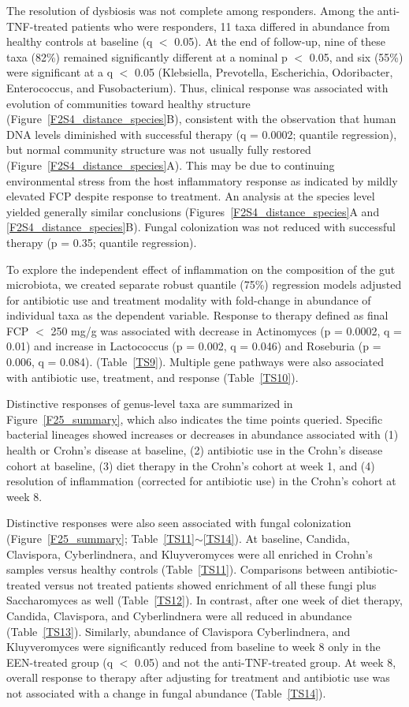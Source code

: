 The resolution of dysbiosis was not complete among responders. Among the anti-TNF-treated patients who were responders, 11 taxa differed in abundance from healthy controls at baseline (q $<$ 0.05). At the end of follow-up, nine of these taxa (82\%) remained significantly different at a nominal p $<$ 0.05, and six (55\%) were significant at a q $<$ 0.05 (Klebsiella, Prevotella, Escherichia, Odoribacter, Enterococcus, and Fusobacterium). Thus, clinical response was associated with evolution of communities toward healthy structure (Figure~\ref{F2S4_distance_species}B), consistent with the observation that human DNA levels diminished with successful therapy (q = 0.0002; quantile regression), but normal community structure was not usually fully restored (Figure~\ref{F2S4_distance_species}A). This may be due to continuing environmental stress from the host inflammatory response as indicated by mildly elevated FCP despite response to treatment. An analysis at the species level yielded generally similar conclusions (Figures~\ref{F2S4_distance_species}A and \ref{F2S4_distance_species}B). Fungal colonization was not reduced with successful therapy (p = 0.35; quantile regression).

To explore the independent effect of inflammation on the composition of the gut microbiota, we created separate robust quantile (75\%) regression models adjusted for antibiotic use and treatment modality with fold-change in abundance of individual taxa as the dependent variable. Response to therapy defined as final FCP $<$ 250 mg/g was associated with decrease in Actinomyces (p = 0.0002, q = 0.01) and increase in Lactococcus (p = 0.002, q = 0.046) and Roseburia (p = 0.006, q = 0.084). (Table~\ref{TS9}). Multiple gene pathways were also associated with antibiotic use, treatment, and response (Table~\ref{TS10}).

Distinctive responses of genus-level taxa are summarized in Figure~\ref{F25_summary}, which also indicates the time points queried. Specific bacterial lineages showed increases or decreases in abundance associated with (1) health or Crohn's disease at baseline, (2) antibiotic use in the Crohn's disease cohort at baseline, (3) diet therapy in the Crohn's cohort at week 1, and (4) resolution of inflammation (corrected for antibiotic use) in the Crohn's cohort at week 8. 


Distinctive responses were also seen associated with fungal colonization (Figure~\ref{F25_summary}; Table~\ref{TS11}$\sim$\ref{TS14}). At baseline, Candida, Clavispora, Cyberlindnera, and Kluyveromyces were all enriched in Crohn's samples versus healthy controls (Table~\ref{TS11}). Comparisons between antibiotic-treated versus not treated patients showed enrichment of all these fungi plus Saccharomyces as well (Table~\ref{TS12}). In contrast, after one week of diet therapy, Candida, Clavispora, and Cyberlindnera were all reduced in abundance (Table~\ref{TS13}). Similarly, abundance of Clavispora Cyberlindnera, and Kluyveromyces were significantly reduced from baseline to week 8 only in the EEN-treated group (q $<$ 0.05) and not the anti-TNF-treated group. At week 8, overall response to therapy after adjusting for treatment and antibiotic use was not associated with a change in fungal abundance (Table~\ref{TS14}).


